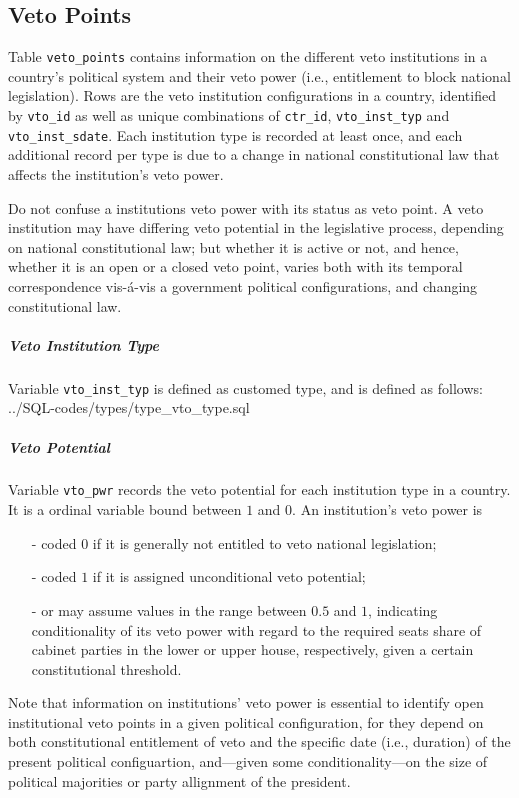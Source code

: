 \subsection{Veto Points}\label{subsec_tab_veto_points}

Table \texttt{veto\_points} contains information on the different veto institutions in a country’s political system and their veto power (i.e., entitlement to block national legislation).
Rows are the veto institution configurations in a country, identified by \texttt{vto\_id} as well as unique combinations of \texttt{ctr\_id}, \texttt{vto\_inst\_typ} and \texttt{vto\_inst\_sdate}.
Each institution type is recorded at least once, and each additional record per type is due to a change in national constitutional law that affects the institution's veto power.

Do not confuse a institutions veto power with its status as veto point.
A veto institution may have differing veto potential in the legislative process, depending on national constitutional law; but whether it is active or not, and hence, whether it is an open or a closed veto point, varies both with its temporal correspondence vis-\'{a}-vis a government political configurations, and changing constitutional law. 

\subparagraph{Veto Institution Type}
Variable \texttt{vto\_inst\_typ} is defined as customed type, and is defined as follows:
%
{../SQL-codes/types/type_vto_type.sql}

\subparagraph{Veto Potential}
Variable \texttt{vto\_pwr} records the veto potential for each institution type in a country. 
It is a ordinal variable bound between $1$ and $0$. 
An institution's veto power is
\begin{itemize}%
\item[-] coded $0$ if it is generally not entitled to veto national legislation; 
\item[-] coded $1$ if it is assigned unconditional veto potential; 
\item[-] or may assume values in the range between $0.5$ and $1$, indicating conditionality of its veto power with regard to the required seats share of cabinet parties in the lower or upper house, respectively, given a certain constitutional threshold.
\end{itemize}

Note that information on institutions' veto power is essential to identify open institutional veto points in a given political configuration, for they depend on both constitutional entitlement of veto and the specific date (i.e., duration) of the present political configuartion, and---given some conditionality---on the size of political majorities or party allignment of the president.


